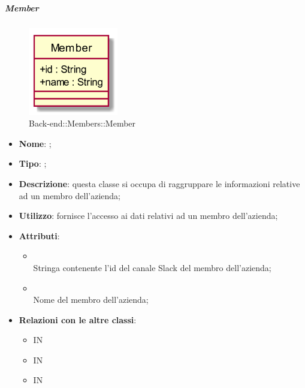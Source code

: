 \hypertarget{Member_label}{\subparagraph{Member}}
\begin{figure}[h]
	\centering
	\includegraphics[width=0.35\textwidth,height=\textheight,keepaspectratio]{images/ClassMember.png}
	\caption{Back-end::Members::Member}
\end{figure}
\begin{itemize}
	\item \textbf{Nome}: ;
	\item \textbf{Tipo}: ;
	\item \textbf{Descrizione}: questa classe si occupa di raggruppare le informazioni relative ad un membro dell'azienda;
	\item \textbf{Utilizzo}: fornisce l'accesso ai dati relativi ad un membro dell'azienda;
	\item \textbf{Attributi}:
	\begin{itemize}
		\item[]  \\
		Stringa contenente l'id del canale Slack del membro dell'azienda;
		\item[]  \\
		Nome del membro dell'azienda;
	\end{itemize}
	\item \textbf{Relazioni con le altre classi}:
	\begin{itemize}
		\item IN \hyperlink{<<interface>> MembersDAO_label}{}
		\item IN \hyperlink{MemberObserver_label}{}
		\item IN \hyperlink{MembersDAOSlack_label}{}
	\end{itemize}
\end{itemize}
\FloatBarrier

